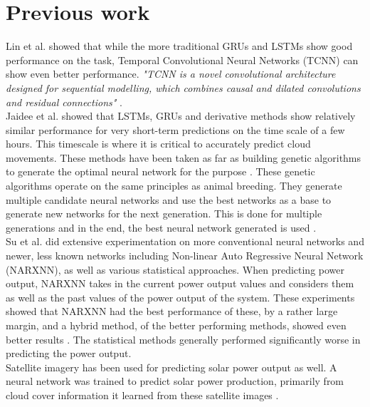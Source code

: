\section{Previous work}
Lin et al. \cite{lin_temporal_2020} showed that while the more traditional GRUs and LSTMs show good performance on the task, Temporal Convolutional Neural Networks (TCNN) can show even better performance. \textit{"TCNN is a novel convolutional architecture designed for sequential modelling, which combines causal and dilated convolutions
and residual connections"} \cite{lin_temporal_2020}. \\
Jaidee et al. \cite{jaidee_very_2019} showed that LSTMs, GRUs and derivative methods show relatively similar performance for very short-term predictions on the time scale of a few hours. This timescale is where it is critical to accurately predict cloud movements. 
These methods have been taken as far as building genetic algorithms to generate the optimal neural network for the purpose \cite{jaidee_very_2019}. These genetic algorithms operate on the same principles as animal breeding. They generate multiple candidate neural networks and use the best networks as a base to generate new networks for the next generation. This is done for multiple generations and in the end, the best neural network generated is used \cite{jaidee_very_2019}.\\
Su et al. \cite{su_machine_2019} did extensive experimentation on more conventional neural networks and newer, less known networks including  Non-linear Auto Regressive Neural Network (NARXNN), as well as various statistical approaches. When predicting power output, NARXNN takes in the current power output values and considers them as well as the past values of the power output of the system. These experiments showed that NARXNN had the best performance of these, by a rather large margin, and a hybrid method, of the better performing methods, showed even better results \cite{anderson_using_2018}. The statistical methods generally performed significantly worse in predicting the power output. \\
Satellite imagery has been used for predicting solar power output as well. A neural network was trained to predict solar power production, primarily from cloud cover information it learned from these satellite images \cite{jang_solar_2016}.\\